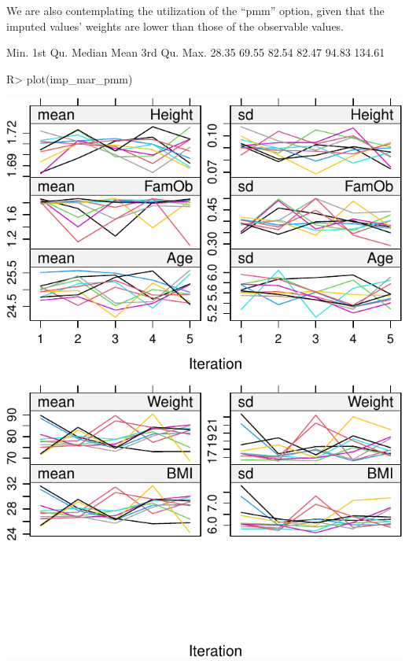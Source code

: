 \documentclass[
]{jss}
\begin{document}
We are also contemplating the utilization of the ``pmm'' option, given
that the imputed values' weights are lower than those of the observable
values.

\begin{CodeChunk}
\begin{CodeOutput}
   Min. 1st Qu.  Median    Mean 3rd Qu.    Max. 
  28.35   69.55   82.54   82.47   94.83  134.61 
\end{CodeOutput}
\begin{CodeInput}
R> plot(imp_mar_pmm)
\end{CodeInput}


\begin{center}\includegraphics{Imputation_of_Incomplete_Multilevel_Data_files/figure-latex/obsmarp_plot-1} \end{center}



\begin{center}\includegraphics{Imputation_of_Incomplete_Multilevel_Data_files/figure-latex/obsmarp_plot-2} \end{center}

\end{CodeChunk}
\end{document}
